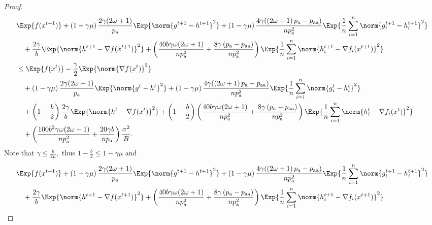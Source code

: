 \documentclass{article}
\newcommand*{\probavailable}{\ensuremath{p_{\textnormal{a}}}}
\newcommand*{\probpairaa}{\ensuremath{p_{\textnormal{aa}}}}
\begin{document}
\begin{proof}
\begin{align*}
        &\Exp{f(x^{t + 1})} + \left(1 - \gamma \mu\right)\frac{2\gamma (2 \omega + 1)}{\probavailable} \Exp{\norm{g^{t+1} - h^{t+1}}^2} + \left(1 - \gamma \mu\right)\frac{4\gamma (\left(2 \omega + 1\right)\probavailable - \probpairaa)}{n \probavailable^2} \Exp{\frac{1}{n}\sum_{i=1}^n\norm{g^{t+1}_i - h^{t+1}_i}^2}\\
        &\quad  + \frac{2\gamma}{b} \Exp{\norm{h^{t+1} - \nabla f(x^{t+1})}^2} + \left(\frac{40 b \gamma \omega (2 \omega + 1)}{n \probavailable^2} + \frac{8 \gamma \left(\probavailable - \probpairaa\right)}{n \probavailable^2}\right) \Exp{\frac{1}{n}\sum_{i=1}^n\norm{h^{t+1}_i - \nabla f_i(x^{t+1})}^2}\\
        &\leq \Exp{f(x^t)} - \frac{\gamma}{2}\Exp{\norm{\nabla f(x^t)}^2} \\
        &\quad + \left(1 - \gamma \mu\right)\frac{2\gamma (2 \omega + 1)}{\probavailable} \Exp{\norm{g^{t} - h^{t}}^2} + \left(1 - \gamma \mu\right)\frac{4\gamma (\left(2 \omega + 1\right)\probavailable - \probpairaa)}{n \probavailable^2} \Exp{\frac{1}{n}\sum_{i=1}^n\norm{g^{t}_i - h^{t}_i}^2} \\
        &\quad + \left(1 - \frac{b}{2}\right)\frac{2\gamma}{b} \Exp{\norm{h^{t} - \nabla f(x^{t})}^2} + \left(1 - \frac{b}{2}\right)\left(\frac{40 b \gamma \omega (2 \omega + 1)}{n \probavailable^2} + \frac{8 \gamma \left(\probavailable - \probpairaa\right)}{n \probavailable^2}\right)\Exp{\frac{1}{n}\sum_{i=1}^n\norm{h^{t}_i - \nabla f_i(x^{t})}^2} \\
        &\quad + \left(\frac{100 b^2 \gamma \omega (2 \omega + 1)}{n \probavailable^2} + \frac{20 \gamma b}{n \probavailable}\right) \frac{\sigma^2}{B}.
      \end{align*}
      Note that $\gamma \leq \frac{b}{2\mu},$ thus $1 - \frac{b}{2} \leq 1 - \gamma \mu$ and 
      \begin{align*}
        &\Exp{f(x^{t + 1})} + \left(1 - \gamma \mu\right)\frac{2\gamma (2 \omega + 1)}{\probavailable} \Exp{\norm{g^{t+1} - h^{t+1}}^2} + \left(1 - \gamma \mu\right)\frac{4\gamma (\left(2 \omega + 1\right)\probavailable - \probpairaa)}{n \probavailable^2} \Exp{\frac{1}{n}\sum_{i=1}^n\norm{g^{t+1}_i - h^{t+1}_i}^2}\\
        &\quad  + \frac{2\gamma}{b} \Exp{\norm{h^{t+1} - \nabla f(x^{t+1})}^2} + \left(\frac{40 b \gamma \omega (2 \omega + 1)}{n \probavailable^2} + \frac{8 \gamma \left(\probavailable - \probpairaa\right)}{n \probavailable^2}\right) \Exp{\frac{1}{n}\sum_{i=1}^n\norm{h^{t+1}_i - \nabla f_i(x^{t+1})}^2}\\

\end{align*}
\end{proof}
\end{document}
